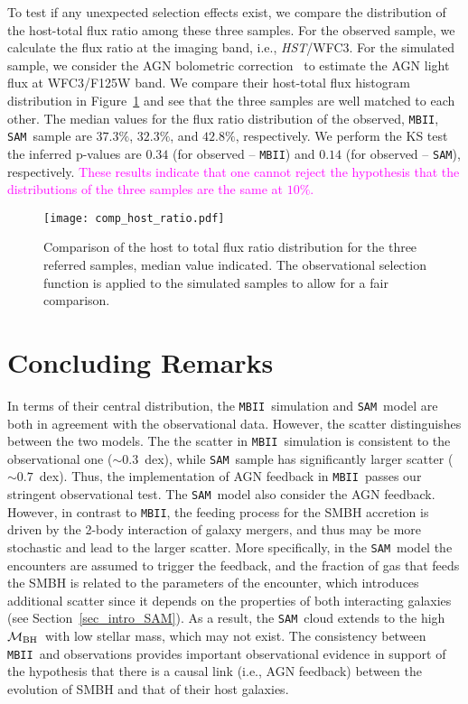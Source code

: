\documentclass[twocolumn,trackchanges]{aastex63}
\newcommand{\hst}{{\it HST}}
\newcommand{\mbh}{$\mathcal M_{\rm BH}$}
\newcommand{\sam}{\texttt{SAM}}
\newcommand{\mbii}{\texttt{MBII}}
\newcommand{\pink}[1]{{ \textcolor{magenta}{#1}}}
\begin{document}
To test if any unexpected selection effects exist, we compare the distribution of the host-total flux ratio among these three samples. For the observed sample, we calculate the flux ratio at the imaging band, i.e., \hst/WFC3. For the simulated sample, we consider the AGN bolometric correction~\citep{Elvis1994} to estimate the AGN light flux at WFC3/F125W band. We compare their host-total flux histogram distribution in Figure~\ref{fig:comp_hist} and see that the three samples are well matched to each other. The median values for the flux ratio distribution of the observed, \mbii, \sam\ sample are $37.3\%$, $32.3\%$, and $42.8\%$, respectively. We perform the KS test the inferred p-values are $0.34$ (for observed -- \mbii) and $0.14$ (for observed -- \sam), respectively.\pink{These results indicate that one cannot reject the hypothesis that the distributions of the three samples are the same at $10\%$.}

\begin{figure}[t]
\texttt{[image: comp\_host\_ratio.pdf]}
\caption{Comparison of the host to total flux ratio distribution for the three referred samples, median value indicated. The observational selection function is applied to the simulated samples to allow for a fair comparison.
}
\label{fig:comp_hist}
\end{figure}

\section{Concluding Remarks}
\label{sec:conclusion}
In terms of their central distribution, the \mbii\ simulation and \sam\ model are both in agreement with the observational data. However, the scatter distinguishes between the two models. The  the scatter in \mbii\ simulation is consistent to the observational one ($\sim0.3$~dex), while \sam\ sample has significantly larger scatter ($\sim0.7$~dex). Thus, the implementation of AGN feedback in \mbii\ passes our stringent observational test. The \sam\ model also consider the AGN feedback. However, in contrast to \mbii, the feeding process for the SMBH accretion is driven by the 2-body interaction of galaxy mergers, and thus may be more stochastic and lead to the larger scatter. More specifically, in the \sam\ model the encounters are assumed to trigger the feedback, and the fraction of gas that feeds the SMBH is related to the parameters of the  encounter, which introduces additional scatter since it depends on the properties of both interacting galaxies (see Section~\ref{sec_intro_SAM}). As a result, the \sam\ cloud extends to the high \mbh\ with low stellar mass, which may not exist. The consistency between \mbii\ and observations provides important observational evidence in support of the hypothesis that there is a causal link (i.e., AGN feedback) between the evolution of SMBH and that of their host galaxies.
\end{document}
